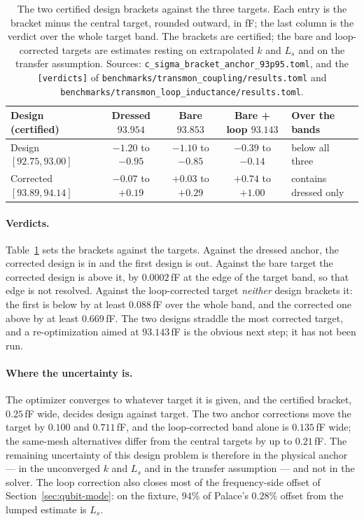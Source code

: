 \documentclass{anvil-paper}
\begin{document}
\begin{table}[t]
  \centering
  \caption{The two certified design brackets against the three targets.
  Each entry is the bracket minus the central target, rounded outward,
  in fF; the last column is the verdict over the whole target band. The
  brackets are certified; the bare and loop-corrected targets are
  estimates resting on extrapolated $k$ and $L_s$ and on the transfer
  assumption. Sources: \texttt{c\_sigma\_bracket\_anchor\_93p95.toml},
  and the \texttt{[verdicts]} of
  \texttt{benchmarks/transmon\_coupling/results.toml} and
  \texttt{benchmarks/transmon\_loop\_inductance/results.toml}.}
  \label{tab:verdicts}
  \footnotesize
  \setlength{\tabcolsep}{4pt}
  \begin{tabular}{@{}lcccl@{}}
    \toprule
    Design (certified) & Dressed $93.954$ & Bare $93.853$ & Bare + loop $93.143$ & Over the bands \\
    \midrule
    Design $[92.75, 93.00]$ & $-1.20$ to $-0.95$ & $-1.10$ to $-0.85$ & $-0.39$ to $-0.14$ & below all three \\
    Corrected $[93.89, 94.14]$ & $-0.07$ to $+0.19$ & $+0.03$ to $+0.29$ & $+0.74$ to $+1.00$ & contains dressed only \\
    \bottomrule
  \end{tabular}
\end{table}

\paragraph{Verdicts.}
Table~\ref{tab:verdicts} sets the brackets against the targets. Against
the dressed anchor, the corrected design is in and the first design is
out. Against the bare target the corrected design is above it, by
$0.0002$\,fF at the edge of the target band, so that edge is not
resolved. Against the loop-corrected target \emph{neither} design
brackets it: the first is below by at least $0.088$\,fF over the whole
band, and the corrected one above by at least $0.669$\,fF. The two
designs straddle the most corrected target, and a re-optimization aimed
at $93.143$\,fF is the obvious next step; it has not been run.

\paragraph{Where the uncertainty is.}
The optimizer converges to whatever target it is given, and the
certified bracket, $0.25$\,fF wide, decides design against target. The
two anchor corrections move the target by $0.100$ and $0.711$\,fF, and
the loop-corrected band alone is $0.135$\,fF wide; the same-mesh
alternatives differ from the central targets by up to $0.21$\,fF. The
remaining uncertainty of this design problem is therefore in the
physical anchor --- in the unconverged $k$ and $L_s$ and in the transfer
assumption --- and not in the solver. The loop correction also closes
most of the frequency-side offset of Section~\ref{sec:qubit-mode}: on
the fixture, $94\%$ of Palace's $0.28\%$ offset from the lumped estimate
is $L_s$.
\end{document}
